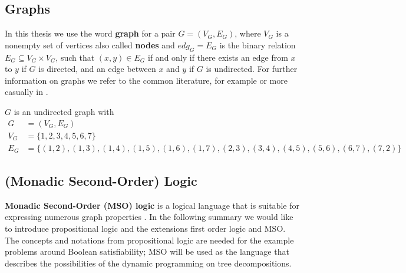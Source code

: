\documentclass[a4paper, 12pt, bibliography=totoc]{scrartcl}
\begin{document}
\subsection{Graphs}

In this thesis we use the word \textbf{graph} for a pair $G=(V_{G},E_{G})$, where $V_{G}$ is a nonempty set of vertices also called \textbf{nodes} and $edg_{G} = E_{G}$ is the binary relation $E_{G} \subseteq V_{G} \times V_{G}$, such that $(x,y)\in E_{G}$ if and only if there exists an edge from $x$ to $y$ if $G$ is directed, and an edge between $x$ and $y$ if $G$ is undirected. For further information on graphs we refer to the common literature, for example \cite[p. {401--412}]{HandbookMathGraph} or more casually in \cite{britannicagraphs}. 

\begin{example}\label{ex:wheelgraph}
	$G$ is an undirected graph with
	\begin{align*}
	 G&=(V_{G},E_{G})\\
	 	 V_{G} &= \{1,2,3,4,5,6,7\}\\
	   E_{G} &= \{(1,2),(1,3), (1,4), (1,5),(1,6), (1,7), (2,3), (3,4), (4,5), (5,6), (6,7), (7,2)\}
	\end{align*}
\end{example}

\subsection{(Monadic Second-Order) Logic}\label{sec:MSO}

\textbf{Monadic Second-Order (MSO) logic} is a logical language that is suitable for expressing numerous graph properties \cite[p.~41]{Courcelle2012}. In the following summary we would like to introduce propositional logic and the extensions first order logic and MSO. The concepts and notations from propositional logic are needed for the example problems around Boolean satisfiability; MSO will be used as the language that describes the possibilities of the dynamic programming on tree decompositions.
\end{document}
